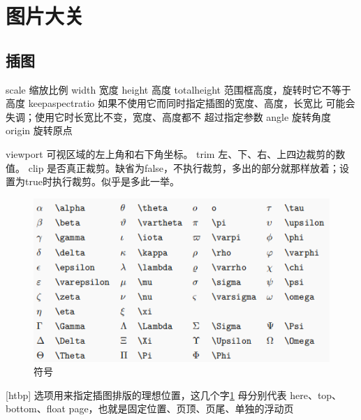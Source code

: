 \documentclass[12pt]{ctexart} %
\begin{document}
\section{图片大关}
\subsection{插图}
scale 缩放比例
width 宽度
height 高度
totalheight 范围框高度，旋转时它不等于高度
keepaspectratio 如果不使用它而同时指定插图的宽度、高度，长宽比
可能会失调；使用它时长宽比不变，宽度、高度都不
超过指定参数
angle 旋转角度
origin 旋转原点

viewport 可视区域的左上角和右下角坐标。
trim 左、下、右、上四边裁剪的数值。
clip 是否真正裁剪。缺省为false，不执行裁剪，多出的部分就那样放着；设置为true时执行裁剪。似乎是多此一举。

\begin{figure}[htbp]%
\centering
\includegraphics[bb=0 0 410 307,scale=.6]{figures/fuhao.png}
\caption{符号}
\label{fig:fu}
\end{figure}

[htbp] 选项用来指定插图排版的理想位置，这几个字\ref{fig:fu}
母分别代表 here、top、bottom、float page，也就是固定位置、页顶、页尾、单独的浮动页
\end{document}
